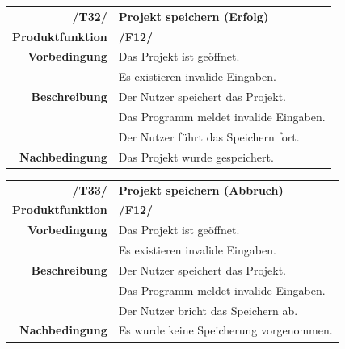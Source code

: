 \documentclass{article}
\begin{document}
\begin{table}[H]
\begin{tabularx}{\textwidth}{rX}
 \vspace{1mm}
\textbf{/T32/}         & \textbf{Projekt speichern (Erfolg)} \\ \vspace{1mm}
\textbf{Produktfunktion} & \textbf{/F12/} \\
\textbf{Vorbedingung}  & Das Projekt ist geöffnet.   \\ \vspace{1mm} & Es existieren invalide Eingaben. \\
\textbf{Beschreibung}  & Der Nutzer speichert das Projekt. \\ & Das Programm meldet invalide Eingaben. \\ \vspace{1mm} & Der Nutzer führt das Speichern fort. \\
\textbf{Nachbedingung} & Das Projekt wurde gespeichert.
\end{tabularx}
\end{table}

\begin{table}[H]
\begin{tabularx}{\textwidth}{rX}
 \vspace{1mm}
\textbf{/T33/}         & \textbf{Projekt speichern (Abbruch)} \\ \vspace{1mm}
\textbf{Produktfunktion} & \textbf{/F12/} \\
\textbf{Vorbedingung}  & Das Projekt ist geöffnet.   \\ \vspace{1mm} & Es existieren invalide Eingaben. \\
\textbf{Beschreibung}  & Der Nutzer speichert das Projekt. \\ & Das Programm meldet invalide Eingaben. \\ \vspace{1mm} & Der Nutzer bricht das Speichern ab. \\
\textbf{Nachbedingung} & Es wurde keine Speicherung vorgenommen.  
\end{tabularx}
\end{table}
\end{document}
